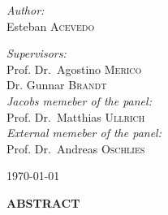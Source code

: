 \begin{titlepage}
\begin{center}
\vspace{3cm}
\begin{minipage}{0.4\textwidth}
\begin{flushleft} 
\emph{Author:}\\
Esteban \textsc{Acevedo}
\end{flushleft}
\end{minipage}
\begin{minipage}{0.4\textwidth}
\begin{flushright}
\emph{Supervisors:} \\
Prof. Dr.~Agostino \textsc{Merico}\\
Dr. Gunnar \textsc{Brandt}\\
\emph{Jacobs memeber of the panel:} \\
Prof. Dr.~Matthias \textsc{Ullrich}\\
\emph{External memeber of the panel:} \\
Prof. Dr.~Andreas \textsc{Oschlies}\\
\end{flushright}
\end{minipage}

\vspace{1.5cm}

{\today}


\end{center}

\large 
\textbf{ABSTRACT} \\

\normalsize


\end{titlepage}
